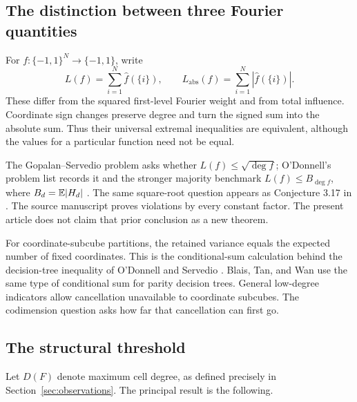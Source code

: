 \subsection{The distinction between three Fourier quantities}

For \(f:\{-1,1\}^N\to\{-1,1\}\), write
\[
 L(f)=\sum_{i=1}^N\widehat f(\{i\}),\qquad
 L_{\mathrm{abs}}(f)=\sum_{i=1}^N|\widehat f(\{i\})|.
\]
These differ from the squared first-level Fourier weight and from total
influence. Coordinate sign changes preserve degree and turn the signed
sum into the absolute sum. Thus their universal extremal inequalities
are equivalent, although the values for a particular function need not
be equal.

The Gopalan--Servedio problem asks whether \(L(f)\le\sqrt{\deg f}\);
O'Donnell's problem list records it and the stronger majority benchmark
\(L(f)\le B_{\deg f}\), where \(B_d=\mathbb E|H_d|\)
\cite{ODonnell2012}. The same square-root question appears as
Conjecture 3.17 in \cite{FHKL2016}. The source manuscript
\cite{OpenAI2026} proves violations by every constant factor. The
present article does not claim that prior conclusion as a new theorem.

For coordinate-subcube partitions, the retained variance equals the
expected number of fixed coordinates. This is the conditional-sum
calculation behind the decision-tree inequality of O'Donnell and
Servedio \cite[Theorem 3]{ODonnellServedio2007}. Blais, Tan, and Wan
\cite[Lemma 3.1]{BlaisTanWan2015} use the same type of conditional sum
for parity decision trees. General low-degree indicators allow
cancellation unavailable to coordinate subcubes. The codimension
question asks how far that cancellation can first go.

\subsection{The structural threshold}

Let \(D(F)\) denote maximum cell degree, as defined precisely in
Section~\ref{sec:observations}. The principal result is the following.

